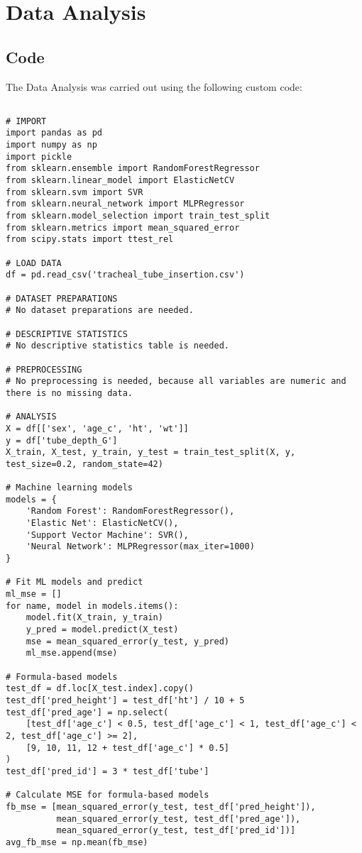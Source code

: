 \documentclass[11pt]{article}
\begin{document}
\section{Data Analysis}
\subsection{{Code}}
The Data Analysis was carried out using the following custom code:

\begin{verbatim}

# IMPORT
import pandas as pd
import numpy as np
import pickle
from sklearn.ensemble import RandomForestRegressor
from sklearn.linear_model import ElasticNetCV
from sklearn.svm import SVR
from sklearn.neural_network import MLPRegressor
from sklearn.model_selection import train_test_split
from sklearn.metrics import mean_squared_error
from scipy.stats import ttest_rel

# LOAD DATA
df = pd.read_csv('tracheal_tube_insertion.csv')

# DATASET PREPARATIONS
# No dataset preparations are needed.

# DESCRIPTIVE STATISTICS
# No descriptive statistics table is needed.

# PREPROCESSING
# No preprocessing is needed, because all variables are numeric and there is no missing data.

# ANALYSIS
X = df[['sex', 'age_c', 'ht', 'wt']]
y = df['tube_depth_G']
X_train, X_test, y_train, y_test = train_test_split(X, y, test_size=0.2, random_state=42)

# Machine learning models
models = {
    'Random Forest': RandomForestRegressor(),
    'Elastic Net': ElasticNetCV(),
    'Support Vector Machine': SVR(),
    'Neural Network': MLPRegressor(max_iter=1000)
}

# Fit ML models and predict
ml_mse = []
for name, model in models.items():
    model.fit(X_train, y_train)
    y_pred = model.predict(X_test)
    mse = mean_squared_error(y_test, y_pred)
    ml_mse.append(mse)

# Formula-based models
test_df = df.loc[X_test.index].copy()
test_df['pred_height'] = test_df['ht'] / 10 + 5
test_df['pred_age'] = np.select(
    [test_df['age_c'] < 0.5, test_df['age_c'] < 1, test_df['age_c'] < 2, test_df['age_c'] >= 2], 
    [9, 10, 11, 12 + test_df['age_c'] * 0.5]
)
test_df['pred_id'] = 3 * test_df['tube']

# Calculate MSE for formula-based models
fb_mse = [mean_squared_error(y_test, test_df['pred_height']), 
          mean_squared_error(y_test, test_df['pred_age']), 
          mean_squared_error(y_test, test_df['pred_id'])]
avg_fb_mse = np.mean(fb_mse)


\end{verbatim}
\end{document}
